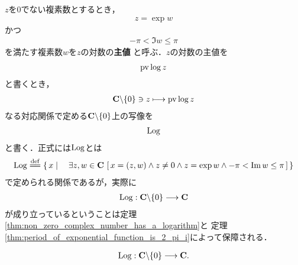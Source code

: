 	$z$を$0$でない複素数とするとき，
	\begin{align}
		z = \exp{w}
	\end{align}
	かつ
	\begin{align}
		-\pi < \Im{w} \leq \pi
	\end{align}
	を満たす複素数$w$を$z$の対数の{\bf 主値}
	と呼ぶ．$z$の対数の主値を
	\begin{align}
		\operatorname{pv}{\log{z}}
	\end{align}
	と書くとき，
	\begin{align}
		\mathbf{C} \backslash \{0\} \ni z \longmapsto \operatorname{pv}{\log{z}}
	\end{align}
	なる対応関係で定める$\mathbf{C} \backslash \{0\}$上の写像を
	\begin{align}
		\operatorname{Log}
	\end{align}
	と書く．正式には$\operatorname{Log}$とは
	\begin{align}
		\pvlog \defeq \Set{x}{\exists z,w \in \C\,
		\left[\, x=(z,w) \wedge z \neq 0 \wedge z = \exp{w} \wedge
		-\pi < \Im{w} \leq \pi\, \right]}
	\end{align}
	で定められる関係であるが，実際に
	\begin{align}
		\operatorname{Log}: \mathbf{C} \backslash \{0\} \longrightarrow \mathbf{C}
	\end{align}
	が成り立っているということは定理\ref{thm:non_zero_complex_number_has_a_logarithm}と
	定理\ref{thm:period_of_exponential_function_is_2_pi_i}によって保障される．
	
	\begin{screen}
		\begin{thm}
			\begin{align}
				\operatorname{Log}: \mathbf{C} \backslash \{0\} \longrightarrow \mathbf{C}.
			\end{align}
		\end{thm}
	\end{screen}
	
